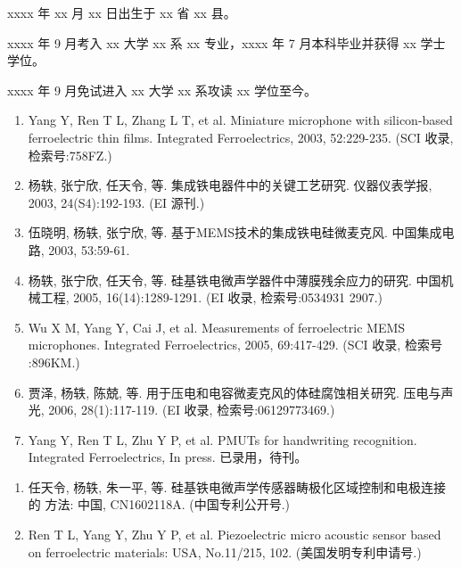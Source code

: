 \begin{resume}


  xxxx 年 xx 月 xx 日出生于 xx 省 xx 县。
  
  xxxx 年 9 月考入 xx 大学 xx 系 xx 专业，xxxx 年 7 月本科毕业并获得 xx 学士学位。
  
  xxxx 年 9 月免试进入 xx 大学 xx 系攻读 xx 学位至今。


  \begin{enumerate}
  \item Yang Y, Ren T L, Zhang L T, et al. Miniature microphone with
    silicon-based ferroelectric thin films. Integrated Ferroelectrics, 2003,
    52:229-235. (SCI 收录, 检索号:758FZ.)
  \item 杨轶, 张宁欣, 任天令, 等. 集成铁电器件中的关键工艺研究. 仪器仪表学报,
    2003, 24(S4):192-193. (EI 源刊.)
  \item 伍晓明, 杨轶, 张宁欣, 等. 基于MEMS技术的集成铁电硅微麦克风. 中国集成电路,
    2003, 53:59-61.
  \item 杨轶, 张宁欣, 任天令, 等. 硅基铁电微声学器件中薄膜残余应力的研究. 中国机
    械工程, 2005, 16(14):1289-1291. (EI 收录, 检索号:0534931 2907.)
  \item Wu X M, Yang Y, Cai J, et al. Measurements of ferroelectric MEMS
    microphones. Integrated Ferroelectrics, 2005, 69:417-429. (SCI 收录, 检索号
    :896KM.)
  \item 贾泽, 杨轶, 陈兢, 等. 用于压电和电容微麦克风的体硅腐蚀相关研究. 压电与声
    光, 2006, 28(1):117-119. (EI 收录, 检索号:06129773469.)
  \item Yang Y, Ren T L, Zhu Y P, et al. PMUTs for handwriting recognition.
    Integrated Ferroelectrics, In press. 已录用，待刊。
  \end{enumerate}

  \begin{enumerate}
  \item 任天令, 杨轶, 朱一平, 等. 硅基铁电微声学传感器畴极化区域控制和电极连接的
    方法: 中国, CN1602118A. (中国专利公开号.)
  \item Ren T L, Yang Y, Zhu Y P, et al. Piezoelectric micro acoustic sensor
    based on ferroelectric materials: USA, No.11/215, 102. (美国发明专利申请号.)
  \end{enumerate}
\end{resume}
